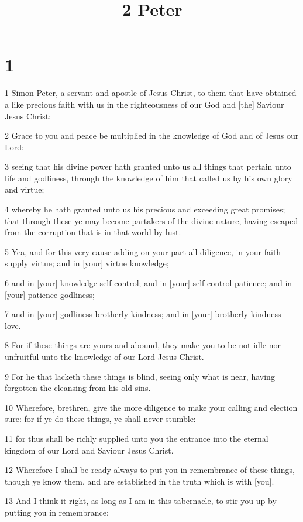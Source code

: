 

\title{2 Peter}

\chapter{1}

\par 1 Simon Peter, a servant and apostle of Jesus Christ, to them that have obtained a like precious faith with us in the righteousness of our God and [the] Saviour Jesus Christ:
\par 2 Grace to you and peace be multiplied in the knowledge of God and of Jesus our Lord;
\par 3 seeing that his divine power hath granted unto us all things that pertain unto life and godliness, through the knowledge of him that called us by his own glory and virtue;
\par 4 whereby he hath granted unto us his precious and exceeding great promises; that through these ye may become partakers of the divine nature, having escaped from the corruption that is in that world by lust.
\par 5 Yea, and for this very cause adding on your part all diligence, in your faith supply virtue; and in [your] virtue knowledge;
\par 6 and in [your] knowledge self-control; and in [your] self-control patience; and in [your] patience godliness;
\par 7 and in [your] godliness brotherly kindness; and in [your] brotherly kindness love.
\par 8 For if these things are yours and abound, they make you to be not idle nor unfruitful unto the knowledge of our Lord Jesus Christ.
\par 9 For he that lacketh these things is blind, seeing only what is near, having forgotten the cleansing from his old sins.
\par 10 Wherefore, brethren, give the more diligence to make your calling and election sure: for if ye do these things, ye shall never stumble:
\par 11 for thus shall be richly supplied unto you the entrance into the eternal kingdom of our Lord and Saviour Jesus Christ.
\par 12 Wherefore I shall be ready always to put you in remembrance of these things, though ye know them, and are established in the truth which is with [you].
\par 13 And I think it right, as long as I am in this tabernacle, to stir you up by putting you in remembrance;
